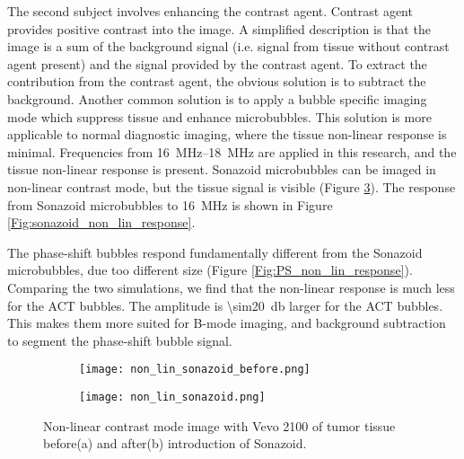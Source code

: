 The second subject involves enhancing the contrast agent. Contrast agent provides positive contrast into the image. A simplified description is that the image is a sum of the background signal (i.e. signal from tissue without contrast agent present) and the signal provided by the contrast agent. To extract the contribution from the contrast agent, the obvious solution is to subtract the background. Another common solution is to apply a bubble specific imaging mode which suppress tissue and enhance microbubbles. This solution is more applicable to normal diagnostic imaging, where the tissue non-linear response is minimal. Frequencies from \SIrange{16}{18}{\mega\hertz} are applied in this research, and the tissue non-linear response is present. Sonazoid\texttrademark{} microbubbles can be imaged in non-linear contrast mode, but the tissue signal is visible (Figure \ref{Fig:Sonazoid non-lin}). The response from Sonazoid\texttrademark{} microbubbles to \SI{16}{\mega\hertz} is shown in Figure \ref{Fig:sonazoid_non_lin_response}.

The phase-shift bubbles respond fundamentally different from the Sonazoid\texttrademark{} microbubbles, due too different size (Figure \ref{Fig:PS_non_lin_response}). Comparing the two simulations, we find that the non-linear response is much less for the ACT\texttrademark{} bubbles. The amplitude is \SI{\sim20}{\decibel} larger for the ACT\texttrademark{} bubbles. This makes them more suited for B-mode imaging, and background subtraction to segment the phase-shift bubble signal.
\begin{figure}
	\centering
	\begin{subfigure}[b]{0.55\textwidth}
		\texttt{[image: non\_lin\_sonazoid\_before.png]}
		\caption{}
		\label{fig:Ng1} 
	\end{subfigure}
	
	\begin{subfigure}[b]{0.55\textwidth}
		\texttt{[image: non\_lin\_sonazoid.png]}
		\caption{}
		\label{fig:Ng2}
	\end{subfigure}
	\caption{Non-linear contrast mode image with Vevo 2100 of tumor tissue before(a) and after(b) introduction of Sonazoid\texttrademark{}.}
	\label{Fig:Sonazoid non-lin}
\end{figure}

